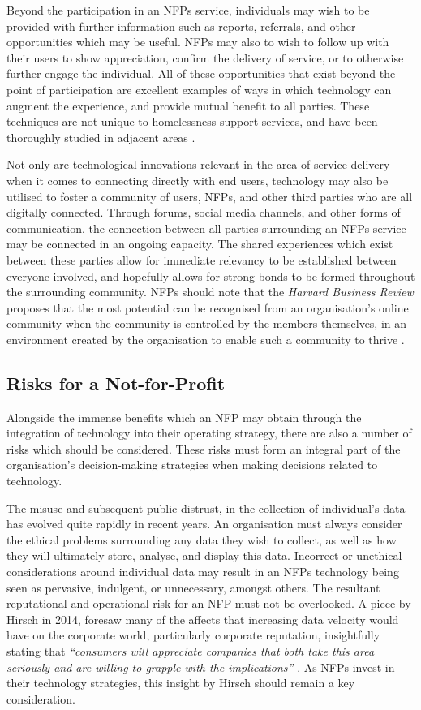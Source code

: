 Beyond the participation in an NFPs service, individuals may wish to be provided with further information such as reports, referrals, and other opportunities which may be useful. NFPs may also to wish to follow up with their users to show appreciation, confirm the delivery of service, or to otherwise further engage the individual. All of these opportunities that exist beyond the point of participation are excellent examples of ways in which technology can augment the experience, and provide mutual benefit to all parties. These techniques are not unique to homelessness support services, and have been thoroughly studied in adjacent areas \cite{bovaird2007beyond}.

Not only are technological innovations relevant in the area of service delivery when it comes to connecting directly with end users, technology may also be utilised to foster a community of users, NFPs, and other third parties who are all digitally connected. Through forums, social media channels, and other forms of communication, the connection between all parties surrounding an NFPs service may be connected in an ongoing capacity. The shared experiences which exist between these parties allow for immediate relevancy to be established between everyone involved, and hopefully allows for strong bonds to be formed throughout the surrounding community. NFPs should note that the \emph{Harvard Business Review} proposes that the most potential can be recognised from an organisation's online community when the community is controlled by the members themselves, in an environment created by the organisation to enable such a community to thrive \cite{fournier2009getting}.

\subsection{Risks for a Not-for-Profit}

Alongside the immense benefits which an NFP may obtain through the integration of technology into their operating strategy, there are also a number of risks which should be considered. These risks must form an integral part of the organisation's decision-making strategies when making decisions related to technology.

The misuse and subsequent public distrust, in the collection of individual's data has evolved quite rapidly in recent years. An organisation must always consider the ethical problems surrounding any data they wish to collect, as well as how they will ultimately store, analyse, and display this data. Incorrect or unethical considerations around individual data may result in an NFPs technology being seen as pervasive, indulgent, or unnecessary, amongst others. The resultant reputational and operational risk for an NFP must not be overlooked. A piece by Hirsch in 2014, foresaw many of the affects that increasing data velocity would have on the corporate world, particularly corporate reputation, insightfully stating that \emph{“consumers will appreciate companies that both take this area seriously and are willing to grapple with the implications”} \cite{hirsch2013corporate}. As NFPs invest in their technology strategies, this insight by Hirsch should remain a key consideration.


